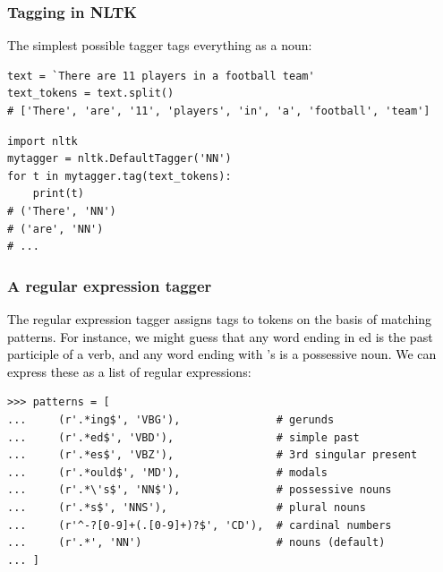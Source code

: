 \begin{frame}[fragile]\frametitle{Tagging in NLTK}
\textcolor{black}{The simplest possible tagger tags everything as a noun:}
\small
\begin{lstlisting}
text = `There are 11 players in a football team'
text_tokens = text.split()
# ['There', 'are', '11', 'players', 'in', 'a', 'football', 'team']
\end{lstlisting}
  
\begin{lstlisting}
import nltk
mytagger = nltk.DefaultTagger('NN')
for t in mytagger.tag(text_tokens):
    print(t)
# ('There', 'NN')
# ('are', 'NN')
# ...
\end{lstlisting}
\end{frame}
%
%
%  


\begin{frame}[fragile]\frametitle{A regular expression tagger}
\textcolor{black}{
The regular expression tagger assigns tags to tokens on the basis of matching patterns. For instance, we might guess that any word ending in ed is the past participle of a verb, and any word ending with 's is a possessive noun. We can express these as a list of regular expressions:}
\small
\begin{lstlisting}
>>> patterns = [
...     (r'.*ing$', 'VBG'),               # gerunds
...     (r'.*ed$', 'VBD'),                # simple past
...     (r'.*es$', 'VBZ'),                # 3rd singular present
...     (r'.*ould$', 'MD'),               # modals
...     (r'.*\'s$', 'NN$'),               # possessive nouns
...     (r'.*s$', 'NNS'),                 # plural nouns
...     (r'^-?[0-9]+(.[0-9]+)?$', 'CD'),  # cardinal numbers
...     (r'.*', 'NN')                     # nouns (default)
... ]
\end{lstlisting}
\end{frame}

